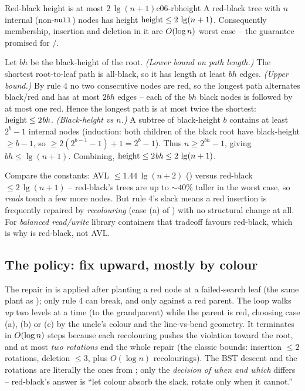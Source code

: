 \begin{theorem}{Red-black height is at most $2\,\lg(n+1)$}{c06-rbheight}
A red-black tree with $n$ internal (non-$\texttt{null}$) nodes has height $\operatorname{height} \le 2\,\lg(n+1)$. Consequently
membership, insertion and deletion in it are $O(\log n)$ worst case -- the guarantee
 promised for /.
\end{theorem}
\begin{proofbox}
Let $\mathit{bh}$ be the black-height of the root. \emph{(Lower bound on path length.)} The shortest root-to-leaf
path is all-black, so it has length at least $\mathit{bh}$ edges. \emph{(Upper bound.)} By rule 4 no two
consecutive nodes are red, so the longest path alternates black/red and has at most $2\mathit{bh}$ edges -- each of
the $\mathit{bh}$ black nodes is followed by at most one red. Hence the longest path is at most twice the shortest:
$\operatorname{height} \le 2\mathit{bh}$. \emph{(Black-height vs $n$.)} A subtree of black-height $b$ contains at least
$2^{b}-1$ internal nodes (induction: both children of the black root have black-height $\ge b-1$, so
$\ge 2(2^{b-1}-1)+1 = 2^{b}-1$). Thus $n \ge 2^{\mathit{bh}}-1$, giving $\mathit{bh} \le \lg(n+1)$. Combining,
$\operatorname{height} \le 2\mathit{bh} \le 2\,\lg(n+1)$. \end{proofbox}
\begin{insightbox}
Compare the constants: AVL $\le 1.44\,\lg(n+2)$ () versus red-black
$\le 2\,\lg(n+1)$ -- red-black's trees are up to $\sim 40\%$ taller in the worst case, so \emph{reads}
touch a few more nodes. But rule 4's slack means a red insertion is frequently repaired by \emph{recolouring}
(case (a) of ) with no structural change at all. For \emph{balanced read/write} library
containers that tradeoff favours red-black, which is why  is red-black, not AVL.
\end{insightbox}

\subsection{The policy: fix upward, mostly by colour}

The repair in  is applied after planting a red node at a failed-search leaf (the same
plant as ); only rule 4 can break, and only against a red parent. The loop
walks \emph{up} two levels at a time (to the grandparent) while the parent is red, choosing case (a), (b)
or (c) by the uncle's colour and the line-vs-bend geometry. It terminates in $O(\log n)$ steps because
each recolouring pushes the violation toward the root, and at most \emph{two rotations} end the whole
repair (the classic bounds: insertion $\le 2$ rotations, deletion $\le 3$, plus $O(\log n)$ recolourings).
The BST descent and the rotations are literally the ones from ; only the
\emph{decision of when and which} differs -- red-black's answer is ``let colour absorb the slack, rotate
only when it cannot.''

